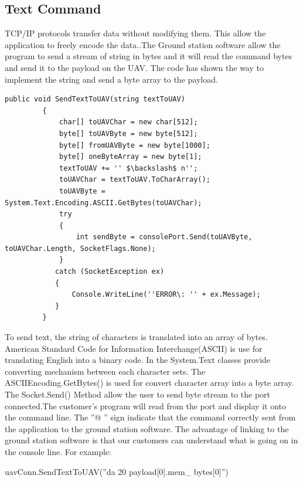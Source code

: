 \subsection{Text Command}
TCP/IP protocols transfer data without modifying them. This allow the application to freely encode the data.\cite{davidB}.The Ground station software allow the program to send a stream of string in bytes and it will read the command bytes and send it to the payload on the UAV. The code has shown the way to implement the string and send a byte array to the payload.
	
	

\begin{lstlisting}[caption={send text in byte array},label=lst:sendT]
	 public void SendTextToUAV(string textToUAV)	        
         {        
             char[] toUAVChar = new char[512];       
             byte[] toUAVByte = new byte[512];        
             byte[] fromUAVByte = new byte[1000];       
             byte[] oneByteArray = new byte[1];       
             textToUAV += '' $\backslash$ n'';        
             toUAVChar = textToUAV.ToCharArray();        
             toUAVByte = System.Text.Encoding.ASCII.GetBytes(toUAVChar);       
             try       
             {      
                 int sendByte = consolePort.Send(toUAVByte, toUAVChar.Length, SocketFlags.None);     
             }     
            catch (SocketException ex)      
            {       
                Console.WriteLine(''ERROR\: '' + ex.Message);       
            }       
         }
\end{lstlisting}
                

To send text, the string of characters is translated into an array of bytes. American Standard Code for Information Interchange(ASCII) is use for translating English into a binary code. In the System.Text classes provide converting mechanism between each character sets. The ASCIIEncoding.GetBytes() is used for convert character array into a byte array.  
The Socket.Send() Method allow the user to send byte stream to the port connected.The customer's program will read from the port and display it onto the command line. The ''@ '' sign indicate that the command correctly sent from the application to the ground station software. The advantage of linking to the ground station software is that our customers can understand what is going on in the console line. For example:

\begin{center}
uavConn.SendTextToUAV(''da 20 payload[0].mem\_ bytes[0]'')\;
\end{center}


